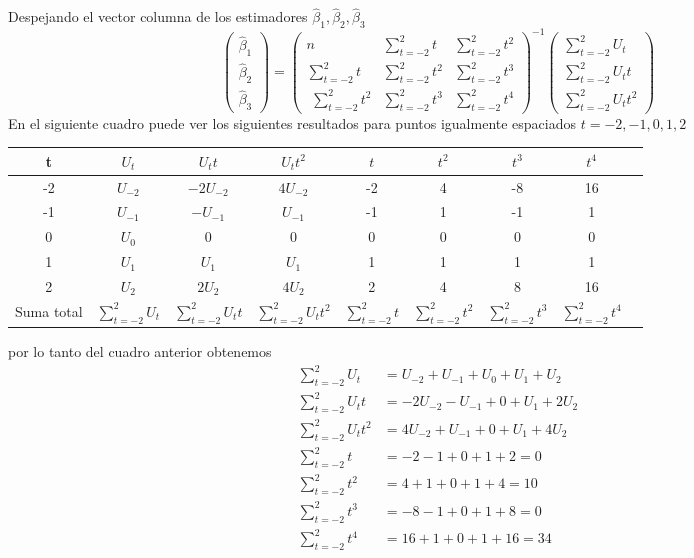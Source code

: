 \documentclass[10pt,a4paper, openany ]{book}
\begin{document}
  Despejando el vector columna de los estimadores  $\hat{\beta}_{1},\hat{\beta}_{2},\hat{\beta}_{3}$
  \begin{equation*}
  \begin{pmatrix}
  \hat{\beta}_{1} \\
    \hat{\beta}_{2}\\
  \hat{\beta}_{3}
  \end{pmatrix}  = \begin{pmatrix}
  n & \sum\limits_{t=-2}^{2}t & \sum\limits_{t=-2}^{2}t^{2}  \\
  \sum\limits_{t=-2}^{2}t & \sum\limits_{t=-2}^{2}t^{2} & \sum\limits_{t=-2}^{2}t^{3} \\
  \, \, \sum\limits_{t=-2}^{2}t^{2} & \sum\limits_{t=-2}^{2}t^{3} & \sum\limits_{t=-2}^{2}t^{4}
  \end{pmatrix}^{-1} \begin{pmatrix}
  \sum\limits_{t=-2}^{2}U_{t}  \\
  \sum\limits_{t=-2}^{2}U_{t}t \\
  \sum\limits_{t=-2}^{2}U_{t}t^{2} 
  \end{pmatrix} 
  \end{equation*}
  En el siguiente cuadro puede ver los siguientes resultados para puntos igualmente espaciados $ t = -2, -1, 0, 1, 2$
  \begin{center}
  \begin{tabular}{|c|c|c|c|c|c|c|c|c|}
    \hline t & $U_{t}$ & $U_{t}t$ & $U_{t}t^{2}$ & $t$ & $t^{2}$ & $t^{3}$& $t^{4}$ \\
    \hline -2 & $U_{-2}$ & $-2U_{-2}$ & $4U_{-2}$&-2 & 4&-8&16   \\
    \hline -1 & $U_{-1}$ & $-U_{-1}$ & $U_{-1}$&-1&1&-1&1  \\
    \hline 0 & $U_{0}$ & $0$ & $0$&0&0&0&0  \\
    \hline 1 & $U_{1}$ & $U_{1}$ & $U_{1}$&1 &1&1&1  \\
    \hline 2 & $U_{2}$ & $2U_{2}$ & $4U_{2}$&2 &4&8&16  \\ 
    \hline Suma total & $\sum\limits_{t=-2}^{2}U_{t}$& $\sum\limits_{t=-2}^{2}U_{t}t$ & $\sum\limits_{t=-2}^{2}U_{t}t^{2}$&$\sum\limits_{t=-2}^{2}t$ &$\sum\limits_{t=-2}^{2}t^{2}$&$\sum\limits_{t=-2}^{2}t^{3}$&$\sum\limits_{t=-2}^{2}t^{4}$\\ \hline
  \end{tabular} 
  \end{center}
  por lo tanto del cuadro anterior obtenemos 
  \begin{align*}
      \sum\limits_{t=-2}^{2}U_{t} &= U_{-2} +U_{-1}+U_{0}+U_{1}+U_{2} \\
      \sum\limits_{t=-2}^{2}U_{t}t &= -2U_{-2} -U_{-1}+0+U_{1}+2U_{2} \\
      \sum\limits_{t=-2}^{2}U_{t}t^{2} &= 4U_{-2} +U_{-1}+0+U_{1}+4U_{2}\\
      \sum\limits_{t=-2}^{2}t &= -2 -1+0+1+2 = 0\\
      \sum\limits_{t=-2}^{2}t^{2} &= 4 +1+0+1+4 = 10\\
      \sum\limits_{t=-2}^{2}t^{3} &= -8 -1+0+1+8 = 0\\
    \sum\limits_{t=-2}^{2}t^{4}  &= 16 +1+0+1+16 = 34\\
  \end{align*}
\end{document}
